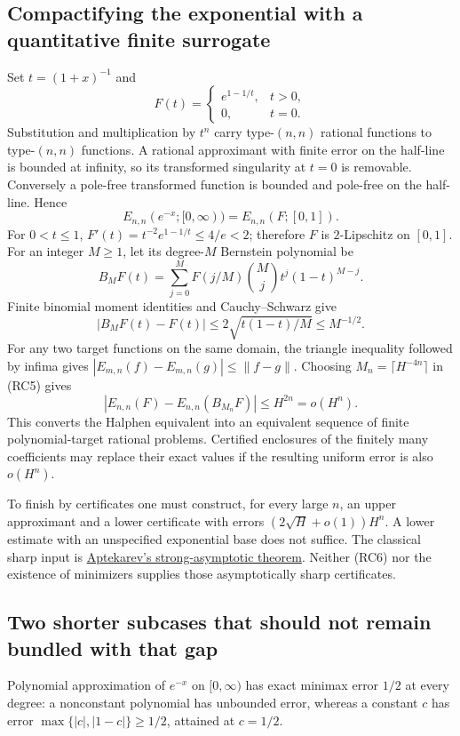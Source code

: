 \documentclass[11pt,a4paper]{article}
\theoremstyle{definition}
\begin{document}
\subsection{Compactifying the exponential with a quantitative finite surrogate}
Set $t=(1+x)^{-1}$ and
\[
 F(t)=\begin{cases}e^{1-1/t},&t>0,\\0,&t=0.\end{cases}
\]
Substitution and multiplication by $t^n$ carry type-$(n,n)$ rational
functions to type-$(n,n)$ functions. A rational approximant with finite
error on the half-line is bounded at infinity, so its transformed
singularity at $t=0$ is removable. Conversely a pole-free transformed
function is bounded and pole-free on the half-line. Hence
\[
 E_{n,n}(e^{-x};[0,\infty))=E_{n,n}(F;[0,1]). \tag{RC4}
\]
For $0<t\le1$, $F'(t)=t^{-2}e^{1-1/t}\le4/e<2$;
therefore $F$ is $2$-Lipschitz on $[0,1]$.
For an integer $M\ge1$, let its degree-$M$ Bernstein polynomial be
\[
 B_MF(t)=\sum_{j=0}^M F(j/M)\binom Mj t^j(1-t)^{M-j}.
\]
Finite binomial moment identities and Cauchy--Schwarz give
\[
 |B_MF(t)-F(t)|\le2\sqrt{t(1-t)/M}\le M^{-1/2}. \tag{RC5}
\]
For any two target functions on the same domain, the triangle
inequality followed by infima gives
$|E_{m,n}(f)-E_{m,n}(g)|\le\|f-g\|$.
Choosing $M_n=\lceil H^{-4n}\rceil$ in (RC5) gives
\[
 |E_{n,n}(F)-E_{n,n}(B_{M_n}F)|\le H^{2n}=o(H^n). \tag{RC6}
\]
This converts the Halphen equivalent into an equivalent sequence of
finite polynomial-target rational problems. Certified enclosures of
the finitely many coefficients may replace their exact values if the
resulting uniform error is also $o(H^n)$.

To finish by certificates one must construct, for every large $n$,
an upper approximant and a lower certificate with errors
$(2\sqrt H+o(1))H^n$. A lower estimate with an unspecified
exponential base does not suffice. The classical sharp input is
\href{https://doi.org/10.1070/SM2002v193n01ABEH000619}
{Aptekarev's strong-asymptotic theorem}. Neither (RC6) nor the existence
of minimizers supplies those asymptotically sharp certificates.

\subsection{Two shorter subcases that should not remain bundled with that gap}
Polynomial approximation of $e^{-x}$ on $[0,\infty)$ has exact
minimax error $1/2$ at every degree: a nonconstant polynomial has
unbounded error, whereas a constant $c$ has error
$\max\{|c|,|1-c|\}\ge1/2$, attained at $c=1/2$.
\end{document}
